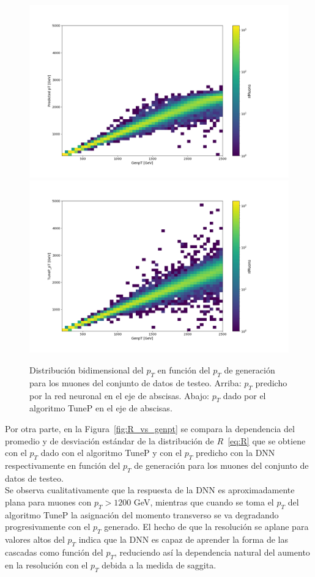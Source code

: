 \begin{figure}[h]
\centering
\includegraphics[width=1.0\textwidth]{figures/data_test_ptpred_genpt.png}
\includegraphics[width=1.0\textwidth]{figures/data_test_tuneppt_genpt.png}

\caption{Distribuci\'on bidimensional del $p_{T}$ en funci\'on del $p_{T}$ de generaci\'on para los muones del conjunto de datos de testeo. Arriba: $p_{T}$ predicho por la red neuronal en el eje de abscisas. Abajo: $p_{T}$ dado por el algoritmo TuneP en el eje de abscisas.}
\label{fig:test_ptpred_tuneppt_genpt}  
\end{figure}

Por otra parte, en la Figura~\ref{fig:R_vs_genpt} se compara la dependencia del promedio y de desviaci\'on est\'andar de la distribuci\'on de $R$~\eqref{eq:R} que se obtiene con el $p_{T}$ dado con el algoritmo TuneP y con el $p_{T}$ predicho con la DNN respectivamente en funci\'on del $p_{T}$ de generaci\'on para los muones del conjunto de datos de testeo. \\
Se observa cualitativamente que la respuesta de la DNN es aproximadamente plana para muones con $p_{T} > 1200$ GeV, mientras que cuando se toma el $p_{T}$ del algoritmo TuneP la asignaci\'on del momento transverso se va degradando progresivamente con el $p_{T}$ generado. El hecho de que la resoluci\'on se aplane para valores altos del $p_{T}$ indica que la DNN es capaz de aprender la forma de las cascadas como funci\'on del $p_{T}$, reduciendo as\'i la dependencia natural del aumento en la resoluci\'on con el $p_{T}$ debida a la medida de saggita. \\

